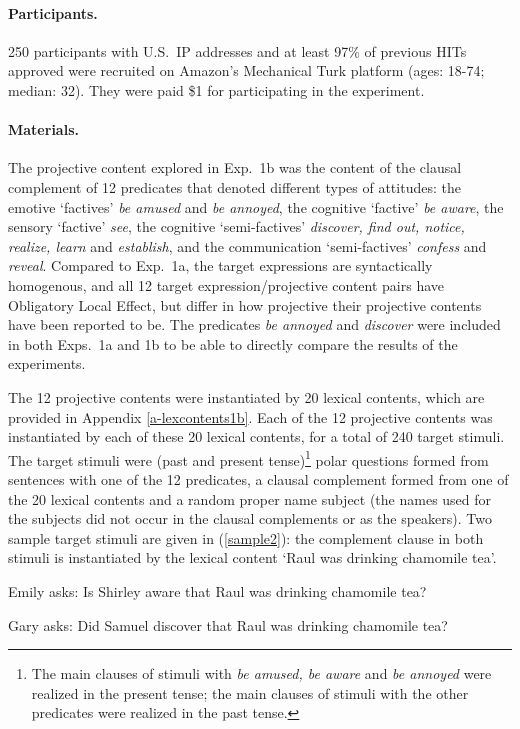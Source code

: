 \documentclass[11pt,fleqn]{article}
\newcommand{\6}{\mbox{$[\hspace*{-.6mm}[$}}
\newcommand{\9}{\mbox{$]\hspace*{-.6mm}]$}}
\begin{document}

\paragraph{Participants.} 250 participants with U.S.\ IP addresses and at least 97\% of previous HITs approved were recruited on Amazon's Mechanical Turk platform (ages: 18-74; median: 32). They were paid \$1 for participating in the experiment.

\paragraph{Materials.} The projective content explored in Exp.~1b was the content of the clausal complement of 12 predicates that denoted different types of attitudes: the emotive `factives' {\em be amused} and {\em be annoyed}, the cognitive `factive' {\em be aware}, the sensory `factive' {\em see}, the cognitive `semi-factives' {\em discover, find out, notice, realize, learn} and {\em establish}, and the communication `semi-factives' {\em confess} and {\em reveal}. Compared to Exp.~1a, the target expressions are syntactically homogenous, and all 12 target expression/projective content pairs have Obligatory Local Effect, but differ in how projective their projective contents have been reported to be. The predicates {\em be annoyed} and {\em discover} were included in both Exps.~1a and 1b to be able to directly compare the results of the experiments.

The 12 projective contents were instantiated by 20 lexical contents, which are provided in Appendix \ref{a-lexcontents1b}.  Each of the 12 projective contents was instantiated by each of these 20 lexical contents, for a total of 240 target stimuli. The target stimuli were (past and present tense)\footnote{The main clauses of stimuli with {\em be amused, be aware} and {\em be annoyed} were realized in the present tense; the main clauses of stimuli with the other predicates were realized in the past tense.} polar questions formed from sentences with one of the 12 predicates, a clausal complement formed from one of the 20 lexical contents and a random proper name subject (the names used for the subjects did not occur in the clausal complements or as the speakers). Two sample target stimuli are given in (\ref{sample2}): the complement clause in both stimuli is instantiated by the lexical content `Raul was drinking chamomile tea'.

\begin{exe}
\ex\label{sample2}
\begin{xlist}
\ex Emily asks: Is Shirley aware that Raul was drinking chamomile tea?

\ex Gary asks: Did Samuel discover that Raul was drinking chamomile tea?
\end{xlist}
\end{exe}
\end{document}
